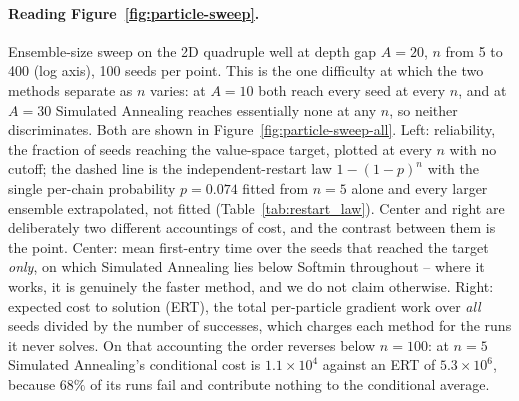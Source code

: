 \documentclass{article} %
\theoremstyle{plain}
\theoremstyle{definition}
\theoremstyle{remark}
\begin{document}
\paragraph{Reading Figure~\ref{fig:particle-sweep}.} Ensemble-size sweep on the 2D quadruple well at depth gap $A=20$, $n$ from 5 to 400 (log axis), 100 seeds per point. This is the one difficulty at which the two methods separate as $n$ varies: at $A=10$ both reach every seed at every $n$, and at $A=30$ Simulated Annealing reaches essentially none at any $n$, so neither discriminates. Both are shown in Figure~\ref{fig:particle-sweep-all}. Left: reliability, the fraction of seeds reaching the value-space target, plotted at every $n$ with no cutoff; the dashed line is the independent-restart law $1-(1-p)^n$ with the single per-chain probability $p=0.074$ fitted from $n=5$ alone and every larger ensemble extrapolated, not fitted (Table~\ref{tab:restart_law}). Center and right are deliberately two different accountings of cost, and the contrast between them is the point. Center: mean first-entry time over the seeds that reached the target \emph{only}, on which Simulated Annealing lies below Softmin throughout -- where it works, it is genuinely the faster method, and we do not claim otherwise. Right: expected cost to solution (ERT), the total per-particle gradient work over \emph{all} seeds divided by the number of successes, which charges each method for the runs it never solves. On that accounting the order reverses below $n=100$: at $n=5$ Simulated Annealing's conditional cost is $1.1\times10^4$ against an ERT of $5.3\times10^6$, because $68\%$ of its runs fail and contribute nothing to the conditional average.
\end{document}
